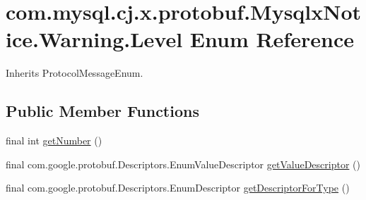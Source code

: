 \hypertarget{enumcom_1_1mysql_1_1cj_1_1x_1_1protobuf_1_1_mysqlx_notice_1_1_warning_1_1_level}{}\section{com.\+mysql.\+cj.\+x.\+protobuf.\+Mysqlx\+Notice.\+Warning.\+Level Enum Reference}
\label{enumcom_1_1mysql_1_1cj_1_1x_1_1protobuf_1_1_mysqlx_notice_1_1_warning_1_1_level}


Inherits Protocol\+Message\+Enum.

\subsection*{Public Member Functions}
\begin{DoxyCompactItemize}
\item 
final int \mbox{\hyperlink{enumcom_1_1mysql_1_1cj_1_1x_1_1protobuf_1_1_mysqlx_notice_1_1_warning_1_1_level_ac4bf586d483503392c195edaa179c40a}{get\+Number}} ()
\item 
final com.\+google.\+protobuf.\+Descriptors.\+Enum\+Value\+Descriptor \mbox{\hyperlink{enumcom_1_1mysql_1_1cj_1_1x_1_1protobuf_1_1_mysqlx_notice_1_1_warning_1_1_level_a8eb3702cbfe1f786d1ce59f2e5b1a219}{get\+Value\+Descriptor}} ()
\item 
final com.\+google.\+protobuf.\+Descriptors.\+Enum\+Descriptor \mbox{\hyperlink{enumcom_1_1mysql_1_1cj_1_1x_1_1protobuf_1_1_mysqlx_notice_1_1_warning_1_1_level_aa70611c911b61441dda9f6a72e1aad96}{get\+Descriptor\+For\+Type}} ()
\end{DoxyCompactItemize}
